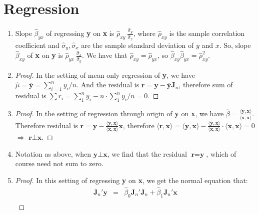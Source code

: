 \documentclass[12pt]{article}
\begin{document}
\section{Regression}

\begin{enumerate}
    \item 
    Slope $\hat{\beta}_{yx}$ of regressing \textbf{y} on \textbf{x} is $\hat{\rho}_{xy}\ \frac{\hat{\sigma}_y}{\hat{\sigma}_x}$, where $\hat{\rho}_{xy}$ is the sample correlation coefficient and $\hat{\sigma}_y, \hat{\sigma}_x$ are the sample standard deviation of $y$ and $x$.
    So, slope $\hat{\beta}_{xy}$ of \textbf{x} on \textbf{y} is $\hat{\rho}_{yx}\ \frac{\hat{\sigma}_x}{\hat{\sigma}_y}$.
    We have that $\hat{\rho}_{xy} = \hat{\rho}_{yx}$, so $\hat{\beta}_{xy} \hat{\beta}_{yx} = \hat{\rho}_{xy}^2$.
    \item
    \begin{proof}
        In the setting of mean only regression of \textbf{y}, we have $\hat{\mu} = \overline{\textbf{y}} = \sum_{i=1}^n y_i / n$.
        And the residual is $\textbf{r} = \textbf{y} - \overline{\textbf{y}} \textbf{J}_n$, therefore sum of residual is $\sum r_i = \sum_1^n y_i - n \cdot \sum_1^n y_i / n = 0$.
    \end{proof}
    \item
    \begin{proof}
        In the setting of regression through origin of \textbf{y} on \textbf{x}, we have $\hat{\beta} = \frac{\langle \textbf{y}, \textbf{x} \rangle}{\langle \textbf{x}, \textbf{x} \rangle}$.
        Therefore residual is $\textbf{r} = \textbf{y} - \frac{\langle \textbf{y}, \textbf{x} \rangle}{\langle \textbf{x}, \textbf{x} \rangle} \textbf{x}$, therefore $\langle \textbf{r}, \textbf{x} \rangle = \langle \textbf{y}, \textbf{x} \rangle - \frac{\langle \textbf{y}, \textbf{x} \rangle}{\langle \textbf{x}, \textbf{x} \rangle}\cdot\langle \textbf{x}, \textbf{x} \rangle = 0$ $\Rightarrow$ $\textbf{r} \bot \textbf{x}$.
    \end{proof}
    \item
    Notation as above, when $\textbf{y} \bot \textbf{x}$, we find that the residual $\textbf{r} = \textbf{y}$, which of course need not sum to zero.
    \item
    \begin{proof}
        In this setting of regressing \textbf{y} on \textbf{x}, we get the normal equation that:
        \begin{eqnarray}
            \textbf{J}_n'\textbf{y} &=& \hat{\beta}_0 \textbf{J}_n'\textbf{J}_n + \hat{\beta}_1 \textbf{J}_n'\textbf{x} \\

\end{eqnarray}
\end{proof}
\end{enumerate}
\end{document}
